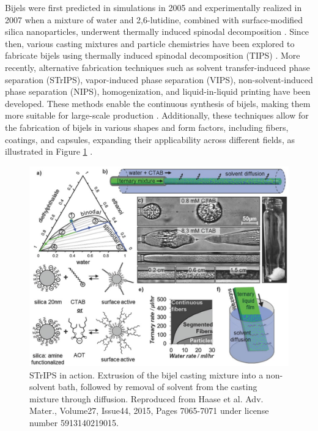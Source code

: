 Bijels were first predicted in simulations in 2005 and experimentally realized in 2007 when a mixture of water and 2,6-lutidine, combined with 
surface-modified silica nanoparticles, underwent thermally induced spinodal decomposition \cite{stratford_colloidal_2005, herzig_bicontinuous_2007}. 
Since then, various casting mixtures and particle chemistries have been explored to fabricate bijels using thermally induced spinodal decomposition (TIPS) 
\cite{lee_bicontinuous_2010, bai_dynamics_2015}. More recently, alternative fabrication techniques such as solvent transfer-induced phase separation (STrIPS), 
vapor-induced phase separation (VIPS), non-solvent-induced phase separation (NIPS), homogenization, and liquid-in-liquid printing have been developed. 
These methods enable the continuous synthesis of bijels, making them more suitable for large-scale production 
\cite{haase_continuous_2015, wang_scalable_2020, cai_bijels_2017, yabuno_preparation_2020, wang_bicontinuous_2023, amirfattahi_fabrication_2024}. 
Additionally, these techniques allow for the fabrication of bijels in various shapes and form factors, including fibers, coatings, and capsules, expanding 
their applicability across different fields, as illustrated in Figure \ref{fig:strips} 
\cite{haase_continuous_2015, boakye-ansah_controlling_2020, kharal_hightensile_2020, wang_bicontinuous_2023}.  

\begin{figure}[h]
    \centering
    \includegraphics[scale = 4]{figures/introduction/STrIPS.jpg}
    \caption{STrIPS in action. Extrusion of the bijel casting mixture into a non-solvent bath, followed by removal of solvent from 
             the casting mixture through diffusion. \cite{haase_continuous_2015} Reproduced from Haase et al. Adv. Mater., 
             Volume27, Issue44, 2015, Pages 7065-7071 under license number 5913140219015. }
    \label{fig:strips}
\end{figure}

